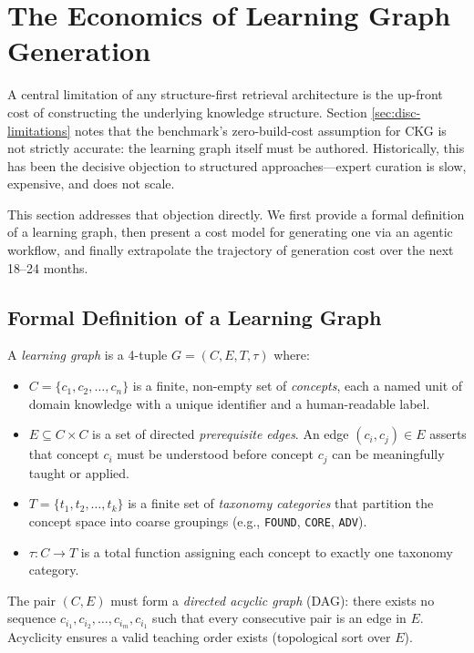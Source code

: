 \section{The Economics of Learning Graph Generation}\label{sec:lg-economics}

A central limitation of any structure-first retrieval architecture is the
up-front cost of constructing the underlying knowledge structure. Section
\ref{sec:disc-limitations} notes that the benchmark's zero-build-cost
assumption for CKG is not strictly accurate: the learning graph itself must
be authored. Historically, this has been the decisive objection to structured
approaches---expert curation is slow, expensive, and does not scale.

This section addresses that objection directly. We first provide a formal
definition of a learning graph, then present a cost model for generating one
via an agentic workflow, and finally extrapolate the trajectory of generation
cost over the next 18--24 months.

\subsection{Formal Definition of a Learning Graph}\label{sec:lg-def}

\begin{definition}\label{def:learning-graph}
A \emph{learning graph} is a 4-tuple $G = (C, E, T, \tau)$ where:
\begin{itemize}
  \item $C = \{c_1, c_2, \ldots, c_n\}$ is a finite, non-empty set of
    \emph{concepts}, each a named unit of domain knowledge with a unique
    identifier and a human-readable label.
  \item $E \subseteq C \times C$ is a set of directed \emph{prerequisite
    edges}. An edge $(c_i, c_j) \in E$ asserts that concept $c_i$ must be
    understood before concept $c_j$ can be meaningfully taught or applied.
  \item $T = \{t_1, t_2, \ldots, t_k\}$ is a finite set of \emph{taxonomy
    categories} that partition the concept space into coarse groupings
    (e.g., \texttt{FOUND}, \texttt{CORE}, \texttt{ADV}).
  \item $\tau : C \rightarrow T$ is a total function assigning each concept
    to exactly one taxonomy category.
\end{itemize}
The pair $(C, E)$ must form a \emph{directed acyclic graph} (DAG): there
exists no sequence $c_{i_1}, c_{i_2}, \ldots, c_{i_m}, c_{i_1}$ such that
every consecutive pair is an edge in $E$. Acyclicity ensures a valid
teaching order exists (topological sort over $E$).
\end{definition}


